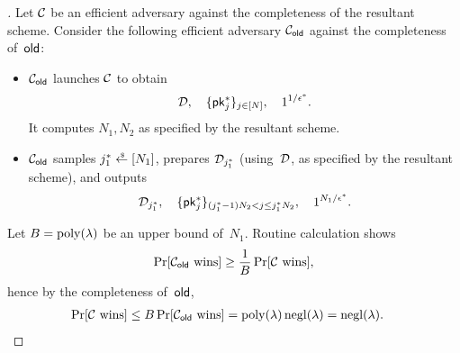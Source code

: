 \begin{proof}[]
Let ${\mathcal{C}}$ be an efficient adversary against the completeness of the resultant scheme.
Consider the following efficient adversary $\scriptC_\OLD$ against the completeness of~$\OLD$:
\begin{itemize}
\item $\scriptC_\OLD$ launches ${\mathcal{C}}$ to obtain
\begin{align*}
\scriptD,\quad
\{\pk^\ast_j\}_{j\in[N]},\quad
1^{1/\epsilon^\ast}.
\end{align*}
It computes $N_1,N_2$ as specified by the resultant scheme.
\item $\scriptC_\OLD$ samples ${j^\ast_1\draws[N_1]}$,
prepares ${\mathcal{D}}_{j^\ast_1}$ (using~${\mathcal{D}}$, as specified by the resultant scheme), and outputs
\begin{align*}
\scriptD_{j^\ast_1},\quad
\{\pk^\ast_j\}_{(j^\ast_1-1)N_2<j\leq j^\ast_1N_2},\quad
1^{N_1/\epsilon^\ast}.
\end{align*}
\end{itemize}
Let ${B=\operatorname{poly}(\lambda)}$ be an upper bound of~$N_1$.
Routine calculation shows
\begin{align*}
\Pr[\scriptC_\OLD\textup{ wins}]
\geq
\frac{1}{B}\Pr[\scriptC\textup{ wins}],
\end{align*}
hence by the completeness of~$\OLD$,
\begin{align*}
\Pr[\scriptC\textup{ wins}]
&{}\leq
B\Pr[\scriptC_\OLD\textup{ wins}]
=
\poly(\lambda)\negl(\lambda)
=
\negl(\lambda).
\qedhere
\end{align*}
\end{proof}
